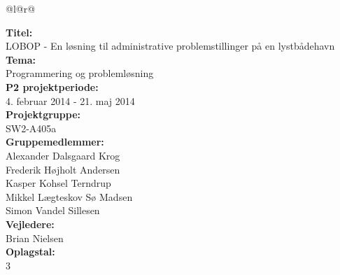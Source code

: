 \pagestyle{titlepagestyle}


\newlength{\realparindent}
\newlength{\realparskip}
\setlength{\realparindent}{\parindent}
\setlength{\realparskip}{\parskip}

\begin{nopagebreak}
{\begin{center}
    \begin{tabular*}{\textwidth}{@{}l@{\extracolsep{\fill}}r@{}}
        \\
        \begin{minipage}[t]{0.49\textwidth}
            \textbf{Titel:}\\
            LOBOP - En løsning til administrative problemstillinger på en lystbådehavn\\

            \textbf{Tema:}\\
            Programmering og problemløsning\\

            \textbf{P2 projektperiode:}\\
            4. februar 2014 - 21. maj 2014\\

            \textbf{Projektgruppe:}\\
            SW2-A405a\\

            \textbf{Gruppemedlemmer:}\\
            Alexander Dalsgaard Krog\\
            Frederik Højholt Andersen\\
            Kasper Kohsel Terndrup\\
            Mikkel Lægteskov Sø Madsen\\
            Simon Vandel Sillesen\\

            \textbf{Vejledere:}\\
            Brian Nielsen\\

            \textbf{Oplagstal:}\\
            3\\


\end{minipage}
\end{tabular*}
\end{center}}
\end{nopagebreak}
